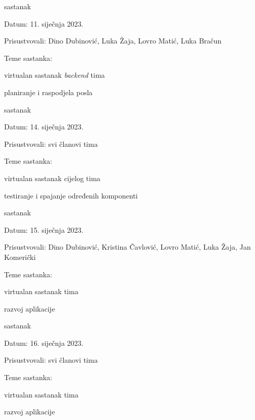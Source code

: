 \begin{packed_enum}
			\item  sastanak
			\item[] \begin{packed_item}
				\item Datum: 11. siječnja 2023.
				\item Prisustvovali: Dino Dubinović, Luka Žaja, Lovro Matić, Luka Bračun
				\item Teme sastanka:
				\begin{packed_item}
					\item  virtualan sastanak \textit{backend} tima
					\item  planiranje i raspodjela posla
				\end{packed_item}
			\end{packed_item}
			
			\item  sastanak
			\item[] \begin{packed_item}
				\item Datum: 14. siječnja 2023.
				\item Prisustvovali: svi članovi tima
				\item Teme sastanka:
				\begin{packed_item}
					\item  virtualan sastanak cijelog tima
					\item  testiranje i spajanje određenih komponenti
				\end{packed_item}
			\end{packed_item}
			
			\item  sastanak
			\item[] \begin{packed_item}
				\item Datum: 15. siječnja 2023.
				\item Prisustvovali: Dino Dubinović, Kristina Čavlović, Lovro Matić, Luka Žaja, Jan Komerički
				\item Teme sastanka:
				\begin{packed_item}
					\item  virtualan sastanak tima
					\item  razvoj aplikacije
				\end{packed_item}
			\end{packed_item}
			
			\item  sastanak
			\item[] \begin{packed_item}
				\item Datum: 16. siječnja 2023.
				\item Prisustvovali: svi članovi tima
				\item Teme sastanka:
				\begin{packed_item}
					\item  virtualan sastanak tima
					\item  razvoj aplikacije
				\end{packed_item}
			\end{packed_item}
			

\end{packed_enum}
